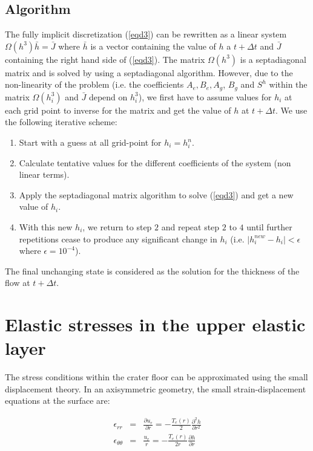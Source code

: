 \begin{article}
\begin{enumerate}
 \subsection{Algorithm}
The fully implicit discretization (\ref{eqd3}) can be rewritten as a linear system $\Omega(h^{3})\bar{h}=\bar{J}$ where $\bar{h}$ is a vector containing the value of $h$ a $t+\Delta t$ and $\bar{J}$ containing the right hand side of (\ref{eqd3}). The matrix $\Omega(h^{3})$ is a septadiagonal matrix and is solved by using a septadiagonal algorithm. However, due to the non-linearity of the problem (i.e. the coefficients $A_{e}, B_{e}, A_{g}$, $B_{g}$ and $S^{h}$ within the matrix $\Omega(h_{i}^{3})$ and $\bar{J}$ depend on $h_{i}^{3}$), we first have to assume values for $h_{i}$ at each grid point to inverse for the matrix and get the value of $h$ at $t+\Delta t$. We use the following iterative scheme: 
\begin{enumerate}
\item Start with a guess at all grid-point for $h_{i}=h_i^n$.
\item Calculate tentative values for the different coefficients of the system (non linear terms).
\item Apply the septadiagonal matrix algorithm to solve (\ref{eqd3}) and get a new value of $h_{i}$.
\item With this new $h_{i}$, we return to step $2$ and repeat step $2$ to $4$ until further repetitions cease to produce any significant change in $h_{i}$ (i.e. $\mid h^{new}_{i}-h_{i}\mid < \epsilon$ where $\epsilon=10^{-4}$).
\end{enumerate}
The final unchanging state is considered as the solution for the thickness of the flow at $t+\Delta t$.

\section{Elastic stresses in the upper elastic layer}
\label{AppendixB}
The stress conditions within the crater floor can be approximated using the small displacement theory. In an axisymmetric geometry, the small strain-displacement equations at the surface are:

\begin{eqnarray}
\epsilon_{rr}&=&\frac{\partial u_{r}}{\partial r}=-\frac{T_{e}(r)}{2}\frac{\partial^{2} h}{\partial r^{2}}\\
\epsilon_{\theta\theta}&=&\frac{u_{r}}{r}=-\frac{T_{e}(r)}{2r}\frac{\partial h}{\partial r} 
\end{eqnarray}


\end{enumerate}
\end{article}
